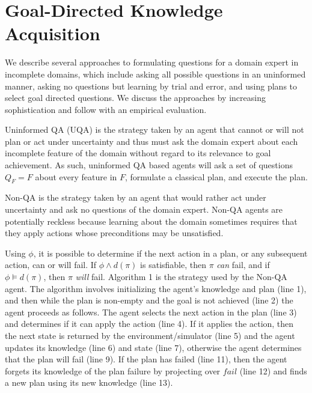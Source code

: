 \documentclass{article}
\begin{document}
\section{Goal-Directed Knowledge Acquisition}

We describe several approaches to formulating questions for a domain expert in
incomplete domains, which include asking all possible questions in an uninformed
manner, asking no questions but learning by trial and error, and using plans to
select goal directed questions. We discuss the approaches by increasing
sophistication and follow with an empirical evaluation.

 Uninformed QA (UQA) is the strategy taken by an agent that
cannot or will not plan or act under uncertainty and thus must ask the domain expert about each incomplete
feature of the domain without regard to its relevance to goal achievement.  As
such, uninformed QA based agents will ask a set of questions $Q_{F} = F$ about
every feature in $F$, formulate a classical plan, and execute the plan.

 Non-QA is the strategy taken by an agent that would rather act
under uncertainty and ask no questions of the domain expert.  Non-QA agents are
potentially reckless because learning about the domain sometimes requires that
they apply actions whose preconditions may be unsatisfied.  

Using $\phi$, it is possible to determine if the next action in a plan, or any
subsequent action, can or will fail.  If  $\phi \wedge d(\pi)$ is
satisfiable, then $\pi$ {\em can} fail, and if $\phi \models d(\pi)$,
then $\pi$ {\em will}  fail.  
 Algorithm  1 is the strategy used by the Non-QA agent.  The
algorithm involves initializing the agent's knowledge and plan (line 1), and then while
the plan is non-empty and the goal is not achieved (line 2) the agent proceeds
as follows.  The agent selects the next action in the plan (line 3) and
determines if it can apply the action (line 4).  If it applies the action, then
the next state is returned by the environment/simulator (line 5) and the agent
updates its knowledge (line 6) and state (line 7),
otherwise the agent determines that the plan will fail (line 9).  If the plan
has failed (line 11), then the agent forgets its knowledge of the plan failure
by projecting over $fail$ (line 12) and finds a new plan using its new knowledge
(line 13).
\end{document}
